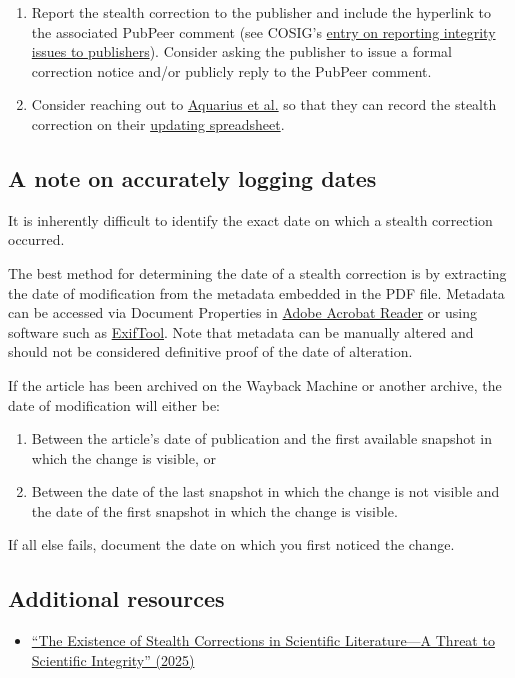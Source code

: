 \documentclass[letterpaper, 12pt]{article}
\begin{document}
\begin{enumerate}
    \item Report the stealth correction to the publisher and include the hyperlink to the associated PubPeer comment (see COSIG's \href{https://osf.io/4edk2}{entry on reporting integrity issues to publishers}). Consider asking the publisher to issue a formal correction notice and/or publicly reply to the PubPeer comment.

    \item Consider reaching out to \href{https://doi.org/10.1002/leap.1660}{Aquarius et al.} so that they can record the stealth correction on their \href{https://docs.google.com/spreadsheets/d/1vmoHAQf1TY6y6lwc8ZI8BxPplfgdeIyGSTauGf3Si2c/edit?usp=sharing}{updating spreadsheet}.
    
\end{enumerate}

\subsection*{A note on accurately logging dates}

It is inherently difficult to identify the exact date on which a stealth correction occurred.

The best method for determining the date of a stealth correction is by extracting the date of modification from the metadata embedded in the PDF file. Metadata can be accessed via Document Properties in \href{https://www.adobe.com/acrobat/pdf-reader.html}{Adobe Acrobat Reader} or using software such as \href{https://exiftool.org/}{ExifTool}. Note that metadata can be manually altered and should not be considered definitive proof of the date of alteration.
    
If the article has been archived on the Wayback Machine or another archive, the date of modification will either be:
\begin{enumerate}
        \setlength\itemsep{-0.5em}
        \item Between the article's date of publication and the first available snapshot in which the change is visible, or
        \item Between the date of the last snapshot in which the change is not visible and the date of the first snapshot in which the change is visible.
    \end{enumerate}
    
If all else fails, document the date on which you first noticed the change.

\subsection*{Additional resources}

\begin{itemize}
    \setlength\itemsep{-0.5em}
    \item \href{https://doi.org/10.1002/leap.1660}{``The Existence of Stealth Corrections in Scientific Literature—A Threat to Scientific Integrity'' (2025)}

\end{itemize}
\end{document}
